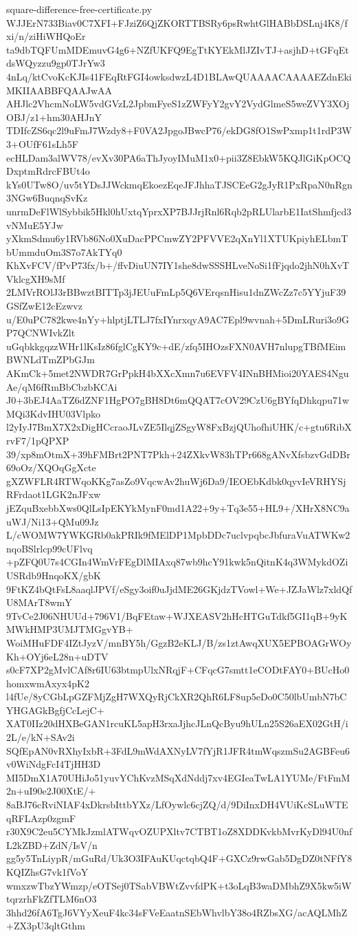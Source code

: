 \documentclass[11pt]{article}
\theoremstyle{definition}
\theoremstyle{remark}
\begin{document}
\begin{filecontents*}[overwrite]{square-difference-free-certificate.py}
WJJErN733Biav0C7XFI+FJziZ6QjZKORTTBSRy6psRwhtGlHABbDSLnj4K8/fxi/n/ziHiWHQoEr
ta9dbTQFUmMDEmuvG4g6+NZfUKFQ9EgTtKYEkMlJZIvTJ+asjhD+tGFqEtdsWQyzzu9gp0TJrYw3
4nLq/ktCvoKcKJIs41FEqRtFGI4owksdwzL4D1BLAwQUAAAACAAAAEZdnEkiMKIIAABBFQAAJwAA
AHJlc2VhcmNoLW5vdGVzL2JpbmFyeS1zZWFyY2gvY2VydGlmeS5weZVY3XOjOBJ/z1+hm30AHJnY
TDIfcZS6qc2l9uFmJ7Wzdy8+F0VA2JpgoJBwcP76/ekDG8fO1SwPxmp1t1rdP3W3+OUfF61sLh5F
ecHLDam3alWV78/evXv30PA6aThJyoyIMuM1x0+pii3Z8EbkW5KQJlGiKpOCQDxptmRdrcFBUt4o
kYs0UTw8O/uv5tYDsJJWckmqEkoezEqeJFJhhaTJSCEeG2gJyR1PxRpaN0nRgn3NGw6BuqnqSvKz
unrmDeFlWlSybbik5Hkl0hUxtqYprxXP7BJJrjRnl6Rqb2pRLUlarbE1IatShmfjcd3vNMuE5YJw
yXkmSdmu6y1RVb86No0XuDacPPCmwZY2PFVVE2qXnYl1XTUKpiyhELbmTbUmmduOm3S7o7AkTYq0
KhXvFCV/fPvP73fx/b+/ffvDiuUN7IY1she8dwSSSHLveNoSi1fFjqdo2jhN0hXvTVklcgXH9sMf
2LMVrROlJ3rBBwztBITTp3jJEUuFmLp5Q6VErqsnHisu1dnZWcZz7c5YYjuF39GSfZwE12cEzwvz
u/E0uPC782kwe4nYy+hlptjLTLJ7fxIYnrxqyA9AC7Epl9wvnah+5DmLRuri3o9GP7QCNWIvkZlt
uGqbkkgqzzWHr1lKsIz86fglCgKY9c+dE/zfq5IHOzsFXN0AVH7nlupgTBfMEimBWNLdTmZPbGJm
AKmCk+5met2NWDR7GrPpkH4bXXcXmn7u6EVFV4INnBHMioi20YAES4NguAe/qM6fRmBbCbzbKCAi
J0+3bEJ4AaTZ6dZNF1HgPO7gBH8Dt6mQQAT7cOV29CzU6gBYfqDhkqpu71wMQi3KdvIHU03Vlpko
l2yIyJ7BmX7X2xDigHCcraoJLvZE5IlqjZSgyW8FxBzjQUhofhiUHK/c+gtu6RibXrvF7/1pQPXP
39/xp8mOtmX+39hFMBrt2PNT7Pkh+24ZXkvW83hTPr668gANvXfsbzvGdDBr69oOz/XQOqGgXcte
gXZWFLR4RTWqoKKg7asZo9VqcwAv2huWj6Da9/IEOEbKdbk0qyvIeVRHYSjRFrdaot1LGK2nJFxw
jEZquBxebbXws0QlLsIpEKYkMynF0md1A22+9y+Tq3e55+HL9+/XHrX8NC9auWJ/Ni13+QMu09Jz
L/cWOMW7YWKGRb0akPRIk9fMElDP1MpbDDc7uclvpqbcJbfuraVuATWKw2nqoBSlrlcp99cUFlvq
+pZFQ0U7s4CGIn4WmVrFEgDlMIAxq87wb9hcY91kwk5nQitnK4q3WMykdOZiUSRdb9HnqoKX/gbK
9FtKZ4bQtFsL8aaqlJPVf/eSgy3oif0uJjdME26GKjdzTVowl+We+JZJaWlz7xldQfU8MArT8wmY
9TvCe2J06NHUUd+796V1/BqFEtaw+WJXEASV2hHcHTGuTdkf5GI1qB+9yKMWkHMP3UMJTMGgvYB+
WoiMHuFDF4IZtJyzV/mnBY5h/GgzB2eKLJ/B/zs1ztAwqXUX5EPBOAGrWOyKh+OYj6eL28n+uDTV
s0cF7XP2gMvlCAf8r6IU63btmpUlxNRqjF+CFqcG7smtt1eCODtFAY0+BUcHo0homxwmAxyx4pK2
l4fUe/8yCGbLpGZFMjZgH7WXQyRjCkXR2QhR6LF8up5eDo0C50lbUmbN7bCYHGAGkBgfjCcLejC+
XAT0IIz20dHXBeGAN1rcuKL5apH3rxaJjhcJLnQcByu9hULn25S26aEX02GtH/i2L/e/kN+SAv2i
SQfEpAN0vRXhyIxbR+3FdL9mWdAXNyLV7fYjR1JFR4tmWqszmSu2AGBFeu6v0WiNdgFcI4TjHH3D
MI5DmX1A70UHiJo51yuvYChKvzMSqXdNddj7xv4EGIeaTwLA1YUMe/FtFmM2n+uI90e2J00XtE/+
8aBJ76cRviNIAF4xDkrsbIttbYXz/LfOywlc6cjZQ/d/9DiInxDH4VUiKcSLuWTEqRFLAzp0zgmF
r30X9C2eu5CYMkJzmlATWqvOZUPXltv7CTBT1oZ8XDDKvkbMvrKyDl94U0nfL2kZBD+ZdN/IsV/n
gg5y5TnLiypR/mGuRd/Uk3O3IFAuKUqctqbQ4F+GXCz9rwGab5DgDZ0tNFfY8KQIZhsG7vk1fVoY
wmxzwTbzYWmzp/eOTSej0TSabVBWtZvvfdPK+t3oLqB3waDMbhZ9X5kw5iWtqrzrhFkZfTLM6nO3
3hhd26fA6TgJ6VYyXeuF4kc34sFVeEaatnSEbWhvlbY38o4RZbsXG/acAQLMhZ+ZX3pU3qltGthm

\end{filecontents*}
\end{document}
